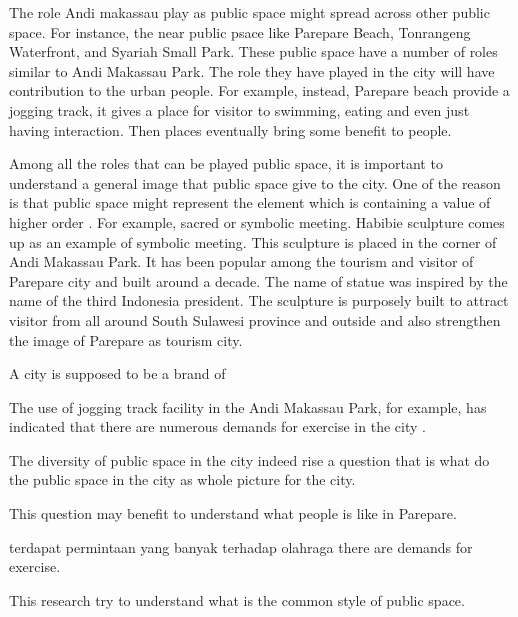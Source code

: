 \documentclass[11pt]{simart} %
\begin{document}
The role Andi makassau play as public space might spread across other public space. For instance, the near public psace like Parepare Beach, Tonrangeng Waterfront, and Syariah Small Park. These public space have a number of roles similar to  Andi Makassau Park. The role they have played in the city will have contribution to the urban people. For example, instead, Parepare beach provide a jogging track, it gives a place for visitor to swimming, eating and even just having interaction. Then places eventually bring some benefit to people.

Among all the roles that can be played public space, it is important to understand a general image that public space give to the city. One of the reason is that public space might represent the element which is containing a value of higher order \citep{akkar2007}.  For example, sacred or symbolic meeting. Habibie sculpture comes up as an example of symbolic meeting. This sculpture is placed in the corner of Andi Makassau Park. It has been popular among the tourism and visitor of Parepare city and built around a decade.
The name of statue was inspired by the name of the third Indonesia president. The sculpture is purposely built to attract visitor from all around South Sulawesi province and outside and also strengthen the image of Parepare as tourism city.


A city is supposed to be a brand of







The use of jogging track facility in the Andi Makassau Park, for example, has indicated that there are numerous demands for exercise in the city \citep{shafar2021}.


The diversity of public space in the city indeed rise a question that is what do the public space in the city as whole picture for the city.

This question may benefit to understand what people is like in Parepare.





terdapat permintaan yang banyak terhadap olahraga
there are demands for exercise.

This research try to understand what is the common style of public space.
\end{document}
